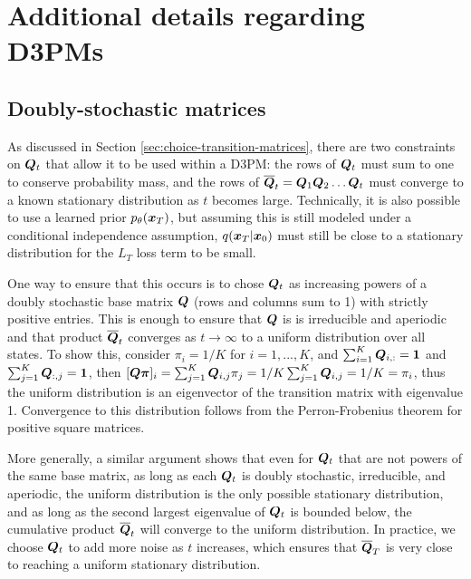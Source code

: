 \appendix
\newpage
\section{Additional details regarding D3PMs}
\subsection{Doubly-stochastic matrices}
\label{appendix:stochastic}

As discussed in Section \ref{sec:choice-transition-matrices}, there are two constraints on $\boldsymbol{Q}_t$ that allow it to be used within a D3PM: the rows of $\boldsymbol{Q}_t$ must sum to one to conserve probability mass, and the rows of $\overline{\boldsymbol{Q}}_{t} = \boldsymbol{Q}_1  \boldsymbol{Q}_2 \hdots \boldsymbol{Q}_t$ must converge to a known stationary distribution as $t$ becomes large. Technically, it is also possible to use a learned prior $p_\theta(\boldsymbol{x}_T)$, but assuming this is still modeled under a conditional independence assumption, $q(\boldsymbol{x}_T | \boldsymbol{x}_0)$ must still be close to a stationary distribution for the $L_T$ loss term to be small.

One way to ensure that this occurs is to chose $\boldsymbol{Q}_t$ as increasing powers of a doubly stochastic base matrix $\boldsymbol{Q}$ (rows and columns sum to 1) with strictly positive entries. This is enough to ensure that $\boldsymbol{Q}$ is is irreducible and aperiodic and that product $\overline{\boldsymbol{Q}}_t$ converges as $t\rightarrow\infty$ to a uniform distribution over all states.
To show this, consider $\pi_i = 1/K$ for $i=1, ..., K$, and $\sum_{i=1}^K \boldsymbol{Q}_{i,:} = \boldsymbol{1}$ and $\sum_{j=1}^K \boldsymbol{Q}_{:, j} = \boldsymbol{1}$, then $[\boldsymbol{Q} \boldsymbol{\pi}]_i = \sum_{j=1}^K \boldsymbol{Q}_{i, j} \pi_j =1/K\sum_{j=1}^K \boldsymbol{Q}_{i, j} = 1/K = \pi_i$, thus the uniform distribution is an eigenvector of the transition matrix with eigenvalue 1. Convergence to this distribution follows from the Perron-Frobenius theorem for positive square matrices.

More generally, a similar argument shows that even for $\boldsymbol{Q}_t$ that are not powers of the same base matrix, as long as each $\boldsymbol{Q}_t$ is doubly stochastic, irreducible, and aperiodic, the uniform distribution is the only possible stationary distribution, and as long as the second largest eigenvalue of $\boldsymbol{Q}_t$ is bounded below, the cumulative product $\overline{\boldsymbol{Q}}_t$ will converge to the uniform distribution. In practice, we choose $\boldsymbol{Q}_t$ to add more noise as $t$ increases, which ensures that $\overline{\boldsymbol{Q}}_T$ is very close to reaching a uniform stationary distribution.


